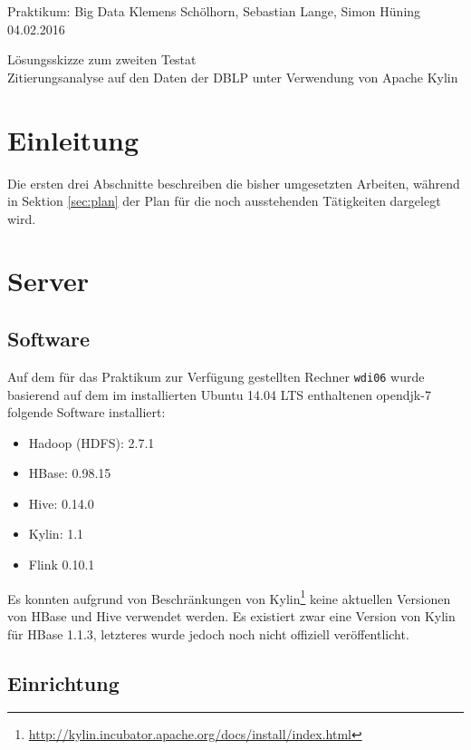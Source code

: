 \documentclass[a4paper,11pt,utf8]{scrartcl}
\begin{document}
\pagestyle{empty}

\noindent
Praktikum: Big Data \hfill Klemens Schölhorn, Sebastian Lange, Simon Hüning \hfill 04.02.2016\vspace{-.4cm}\\
\begin{center}
\huge\textsf{Lösungsskizze zum zweiten Testat}\vspace{.1cm}\\
\large Zitierungsanalyse auf den Daten der DBLP unter Verwendung von Apache Kylin
\end{center}

\section*{Einleitung}

Die ersten drei Abschnitte beschreiben die bisher umgesetzten Arbeiten, während in Sektion \ref{sec:plan} der Plan für die noch ausstehenden Tätigkeiten dargelegt wird.

\section{Server}

\subsection{Software}

Auf dem für das Praktikum zur Verfügung gestellten Rechner \texttt{wdi06} wurde basierend auf dem im installierten Ubuntu 14.04 LTS enthaltenen opendjk-7 folgende Software installiert:

\begin{itemize}
    \item Hadoop (HDFS): 2.7.1
    \item HBase: 0.98.15
    \item Hive: 0.14.0
    \item Kylin: 1.1
    \item Flink 0.10.1
\end{itemize}

\noindent
Es konnten aufgrund von Beschränkungen von Kylin\footnote{\url{http://kylin.incubator.apache.org/docs/install/index.html}} keine aktuellen Versionen von HBase und Hive verwendet werden. Es existiert zwar eine Version von Kylin für HBase 1.1.3, letzteres wurde jedoch noch nicht offiziell veröffentlicht.

\subsection{Einrichtung}
\end{document}
